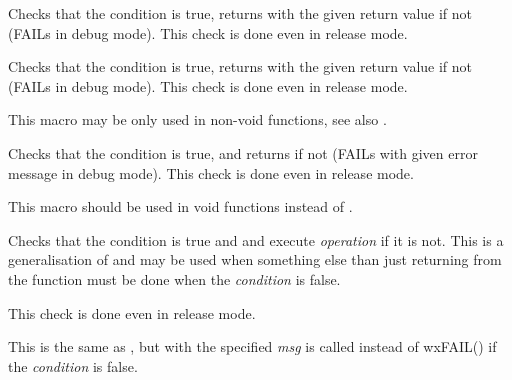 


\label{wxcheck}


Checks that the condition is true, returns with the given return value if not (FAILs in debug mode).
This check is done even in release mode.


\label{wxcheckmsg}


Checks that the condition is true, returns with the given return value if not (FAILs in debug mode).
This check is done even in release mode.

This macro may be only used in non-void functions, see also
.


\label{wxcheckret}


Checks that the condition is true, and returns if not (FAILs with given error
message in debug mode). This check is done even in release mode.

This macro should be used in void functions instead of
.


\label{wxcheck2}


Checks that the condition is true and  and execute
{\it operation} if it is not. This is a generalisation of
 and may be used when something else than just
returning from the function must be done when the {\it condition} is false.

This check is done even in release mode.


\label{wxcheck2msg}


This is the same as , but
 with the specified {\it msg} is called
instead of wxFAIL() if the {\it condition} is false.


\label{wxtrap}

